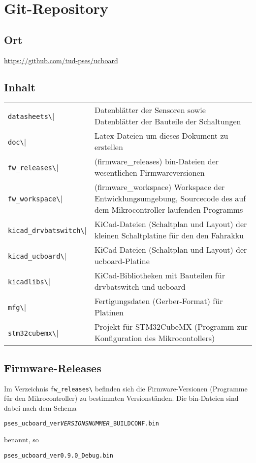 

\chapter{Git-Repository}


\section{Ort}

\href{https://github.com/tud-pses/ucboard}{\color[rgb]{0,0,1}https://github.com/tud-pses/ucboard}

\section{Inhalt}

\begin{tabular}{lp{12cm}}
	\verb|datasheets\| & Datenblätter der Sensoren sowie Datenblätter der Bauteile der Schaltungen \\
	\verb|doc\| & Latex-Dateien um dieses Dokument zu erstellen \\
	\verb|fw_releases\| & (firmware\_releases) bin-Dateien der wesentlichen Firmwareversionen \\
	\verb|fw_workspace\| & (firmware\_workspace) Workspace der Entwicklungsumgebung, Sourcecode des auf dem Mikrocontroller laufenden Programms \\
	\verb|kicad_drvbatswitch\| & KiCad-Dateien (Schaltplan und Layout) der kleinen Schaltplatine für den den Fahrakku \\
	\verb|kicad_ucboard\| & KiCad-Dateien (Schaltplan und Layout) der ucboard-Platine \\
	\verb|kicadlibs\| & KiCad-Bibliotheken mit Bauteilen für drvbatswitch und ucboard \\
	\verb|mfg\| & Fertigungsdaten (Gerber-Format) für Platinen \\
	\verb|stm32cubemx\| & Projekt für STM32CubeMX (Programm zur Konfiguration des Mikrocontollers) \\
\end{tabular}


\section{Firmware-Releases}

Im Verzeichnis \verb|fw_releases\| befinden sich die Firmware-Versionen (Programme für den Mikrocontroller) zu bestimmten Versionständen. Die bin-Dateien sind dabei nach dem Schema
\begin{center}
	\texttt{pses\_ucboard\_ver\textit{VERSIONSNUMMER}\_\texttt{BUILDCONF}.bin}
\end{center}
benannt, so \zB
\begin{center}
	\texttt{pses\_ucboard\_ver0.9.0\_Debug.bin}
\end{center}

